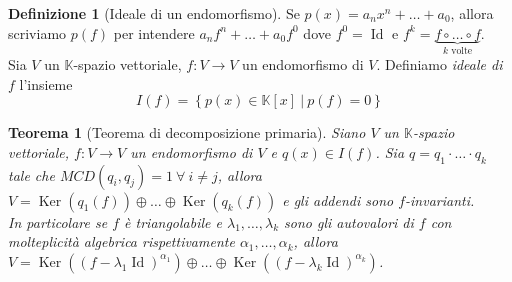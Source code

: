 \documentclass[11pt]{article}
\theoremstyle{plain}
\newtheorem{thm}{Teorema}[section]
\theoremstyle{definition}
\newtheorem{defn}{Definizione}[section]
\theoremstyle{remark}
\newcommand{\K}{\mathbb{K}}
\DeclareMathOperator{\Ker}{Ker}
\DeclareMathOperator{\Id}{Id}
\begin{document}
\begin{defn}[Ideale di un endomorfismo]
	Se $p(x)=a_n x^n+\ldots+a_0$, allora scriviamo $p(f)$ per intendere $a_nf^n+\ldots+a_0f^0$ dove $f^0=\Id$ e $f^k=\underbrace{f\circ\ldots\circ f}_{k \text{ volte}}$.\\
	Sia $V$ un $\K$-spazio vettoriale, $f:V\to V$ un endomorfismo di $V$. Definiamo \textit{ideale di $f$} l'insieme
	\[
		I(f)=\left\{ p(x)\in \K[x]\ |\ p(f)=0 \right\}
	\]


\end{defn}


\begin{thm}[Teorema di decomposizione primaria]
\label{thm:dec_primaria}
	Siano $V$ un $\K$-spazio vettoriale, $f:V\to V$ un endomorfismo di $V$ e $q(x)\in I(f)$. Sia $q=q_1\cdot\ldots\cdot q_k$ tale che $MCD(q_i,q_j)=1\ \forall\ i\neq j$, allora $V=\Ker(q_1(f))\oplus\dots\oplus \Ker(q_k(f))$ e gli addendi sono $f$-invarianti.\\
	In particolare se $f$ è triangolabile e $\lambda_1,\ldots,\lambda_k$ sono gli autovalori di $f$ con molteplicità algebrica rispettivamente $\alpha_1,\ldots,\alpha_k$, allora $V=\Ker\left((f-\lambda_1 \Id)^{\alpha_1}\right)\oplus\dots\oplus \Ker\left((f-\lambda_k \Id)^{\alpha_k}\right)$.
\end{thm}
\end{document}
